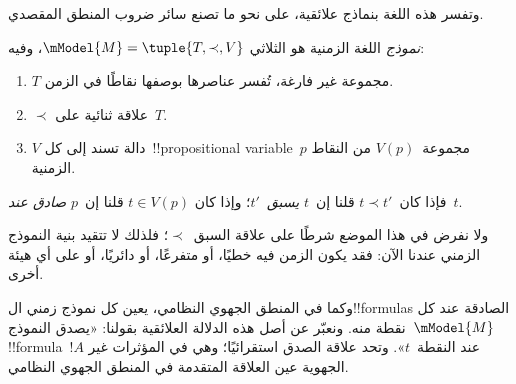 \documentclass[../../../include/open-logic-section]{subfiles}
\begin{document}
وتفسر هذه اللغة بنماذج علائقية، على نحو ما تصنع سائر ضروب المنطق المقصدي.

\begin{defn}
  \emph{نموذج} اللغة الزمنية هو الثلاثي
  $\mModel{M}=\tuple{T,\prec,V}$، وفيه:
  \begin{enumerate}
  \item $T$ مجموعة غير فارغة، تُفسر عناصرها بوصفها نقاطًا في الزمن.
  \item $\prec$ علاقة ثنائية على~$T$.
  \item $V$ دالة تسند إلى كل~!!{propositional
    variable}~$p$ مجموعة~$V(p)$ من النقاط الزمنية.
  \end{enumerate}
  فإذا كان~$t \prec t'$ قلنا إن~$t$ \emph{يسبق}~$t'$؛ وإذا كان
  $t \in V(p)$ قلنا إن~$p$ \emph{صادق عند}~$t$.
\end{defn}

ولا نفرض في هذا الموضع شرطًا على علاقة السبق~$\prec$؛ فلذلك لا تتقيد بنية
النموذج الزمني عندنا الآن: فقد يكون الزمن فيه خطيًا، أو متفرعًا، أو دائريًا،
أو على أي هيئة أخرى.

وكما في المنطق الجهوي النظامي، يعين كل نموذج زمني ال!!{formula}s الصادقة
عند كل نقطة منه. ونعبّر عن أصل هذه الدلالة العلائقية بقولنا: «يصدق
النموذج~$\mModel{M}$ !!{formula}~$!A$ عند النقطة~$t$». وتحد علاقة الصدق
استقرائيًا؛ وهي في المؤثرات غير الجهوية عين العلاقة المتقدمة في المنطق
الجهوي النظامي.
\end{document}
